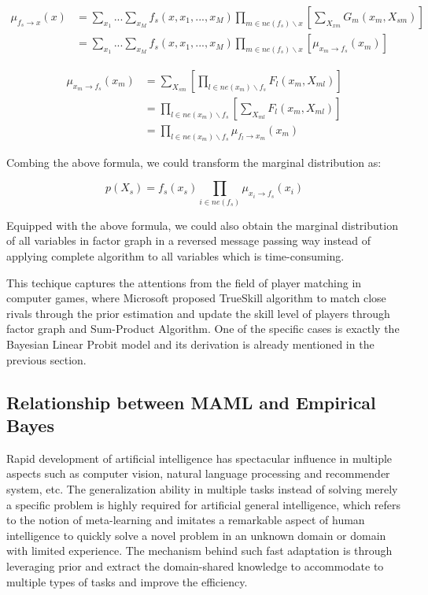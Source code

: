 \documentclass{article}
\begin{document}
\begin{align}
  \mu_{f_s \rightarrow x}(x) 
  & = \sum_{x_1} ... \sum_{x_M} f_s(x,x_1,...,x_M) \prod_{m \in ne(f_s) \backslash x} [\sum_{X_{xm}} G_m(x_m,X_{sm})] \\
  & = \sum_{x_1} ... \sum_{x_M} f_s(x,x_1,...,x_M) \prod_{m \in ne(f_s) \backslash x} [\mu_{x_m \rightarrow f_s} (x_m)] 
\end{align}

\begin{align}
  \mu_{x_m \rightarrow f_s} (x_m) 
  &= \sum_{X_{sm}} [ \prod_{l \in  ne(x_m) \backslash f_s}F_l(x_m,X_{ml})] \\
  &= \prod_{l \in  ne(x_m) \backslash f_s} [\sum_{X_{ml}} F_l(x_m,X_{ml})] \\
  &= \prod_{l \in  ne(x_m) \backslash f_s} \mu_{f_l \rightarrow x_m} (x_m)
\end{align}

Combing the above formula, we could transform the marginal distribution as:

\begin{equation}
  p(X_s) = f_s(x_s) \prod_{i \in ne(f_s)} \mu_{x_i \rightarrow f_s}(x_i)
\end{equation}

Equipped with the above formula, we could also obtain the marginal distribution of all variables in factor graph in a reversed message passing way instead of applying complete algorithm to all variables which is time-consuming.

This techique captures the attentions from the field of player matching in computer games, where Microsoft proposed TrueSkill \cite{TrueSkill,FG} algorithm to match close rivals through the prior estimation and update the skill level of players through factor graph and Sum-Product Algorithm. One of the specific cases is exactly the Bayesian Linear Probit model and its derivation is already mentioned in the previous section.

\subsection{Relationship between MAML and Empirical Bayes}

Rapid development of artificial intelligence has spectacular influence in multiple aspects such as computer vision, natural language processing and recommender system, etc. The generalization ability in multiple tasks instead of solving merely a specific problem is highly required for artificial general intelligence, which refers to the notion of meta-learning and imitates a remarkable aspect of human intelligence to quickly solve a novel problem in an unknown domain or domain with limited experience. The mechanism behind such fast adaptation is through leveraging prior and extract the domain-shared knowledge to accommodate to multiple types of tasks and improve the efficiency.
\end{document}
